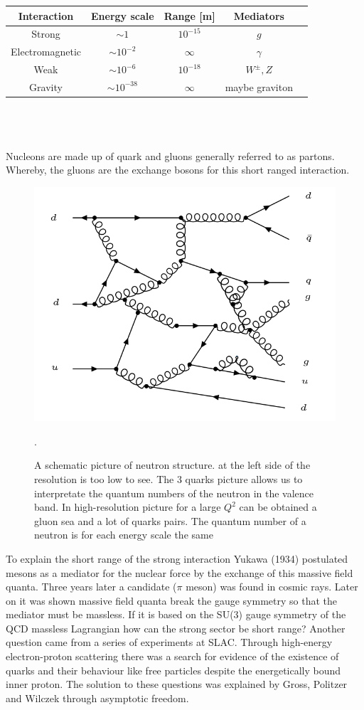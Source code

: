 \begin{tabular}{|c|c|c|c|c|}
\hline 
Interaction & Energy scale & Range [m] & Mediators \\ 
\hline 
Strong & $ \sim 1 $  & $10^{-15} $ & $g$ \\ 
\hline 
Electromagnetic & $ \sim 10^{-2} $ & $\infty$ & $\gamma $ \\ 
\hline  
Weak & $ \sim 10^{-6} $ & $10^{-18}$ & $W^{\pm}, Z$ \\ 
\hline
Gravity & $ \sim 10^{-38} $ & $\infty$ & maybe graviton \\ 
\hline 
\end{tabular}  
\\
\\
\\
Nucleons are made up of quark and gluons generally referred to as partons. Whereby, the gluons are the exchange bosons for this short ranged interaction.
\begin{figure}[h!]
\centering
\includegraphics[scale=0.8]{images/Intro/Neutron.png}
\caption{A schematic picture of neutron structure. at the left side of the resolution is too low to see. The 3 quarks picture allows us to interpretate the quantum numbers of the neutron in the valence band.
In high-resolution picture for a large $ Q^2 $ can be obtained a gluon sea and a lot of quarks pairs\cite{Cunha13}. The quantum number of a neutron is for each energy scale the same}.
\end{figure}
To explain the short range of the strong interaction Yukawa (1934) postulated mesons as a mediator for the nuclear force by the exchange of this massive field quanta. Three years later a candidate ($ \pi $ meson) was found in cosmic rays. Later on it was shown massive field quanta break the gauge symmetry so that the mediator must be massless. If it is based on the SU(3) gauge symmetry of the QCD massless Lagrangian how can the strong sector be short range? Another question came from a series of experiments at SLAC. Through high-energy electron-proton scattering there was a search for evidence of the existence of quarks and their behaviour like free particles despite the energetically bound inner proton. The solution to these questions was explained by Gross, Politzer and Wilczek through asymptotic freedom. 
